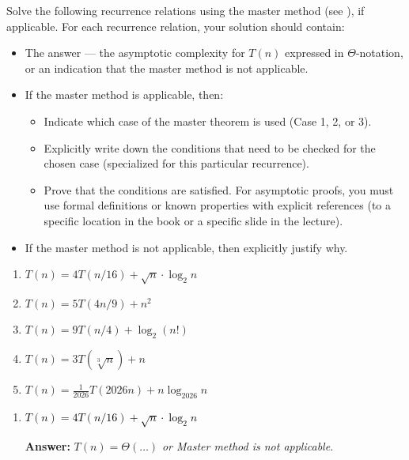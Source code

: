 \documentclass[dvipsnames]{article}
\begin{document}
\clearpage
\begin{problem}
  Solve the following recurrence relations using the master method (see \cite[Theorem~4.1]{CLRS-2022}), if applicable.
  For each recurrence relation, your solution should contain:
  \begin{itemize}
    \item The answer --- the asymptotic complexity for $T(n)$ expressed in $\Theta$-notation, or an indication that the master method is not applicable.
    \item If the master method is applicable, then:
    \begin{itemize}
      \item Indicate which case of the master theorem is used (Case 1, 2, or 3).
      \item Explicitly write down the conditions that need to be checked for the chosen case (specialized for this particular recurrence).
      \item Prove that the conditions are satisfied. For asymptotic proofs, you must use formal definitions or known properties with explicit references (to a specific location in the book \cite{CLRS-2022} or a specific slide in the lecture).
    \end{itemize}
    \item If the master method is not applicable, then explicitly justify why.
  \end{itemize}
  \begin{enumerate}
    \item $T(n) = 4 T(n / 16) + \sqrt{n} \cdot \log_2 n$
    \item $T(n) = 5 T(4 n / 9) + n^2$
    \item $T(n) = 9 T(n / 4) + \log_2 \left(n!\right)$
    \item $T(n) = 3 T(\sqrt[3]{n}) + n$               
    \item $T(n) = \frac{1}{2026} T(2026 n) + n \log_{2026} n$
  \end{enumerate}

\color{purple}

\begin{enumerate}
  \item \textcolor{black}{$T(n) = 4 T(n / 16) + \sqrt{n} \cdot \log_2 n$}
  \begin{mdframed}
    \color{purple}
    \textbf{Answer:} $T(n) = \Theta(\ldots)$ \emph{or Master method is not applicable.}
    

\end{mdframed}
\end{enumerate}
\end{problem}
\end{document}
